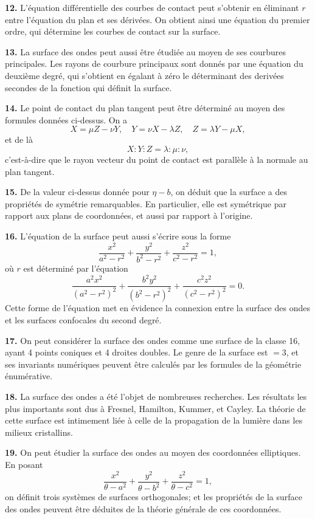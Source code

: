 \documentclass[12pt,a4paper]{article}
\begin{document}
\textbf{12.} L'\'equation diff\'erentielle des courbes de contact peut s'obtenir en
\'eliminant $r$ entre l'\'equation du plan et ses d\'eriv\'ees. On obtient ainsi une
\'equation du premier ordre, qui d\'etermine les courbes de contact sur la surface.

\textbf{13.} La surface des ondes peut aussi \^etre \'etudi\'ee au moyen de ses
courbures principales. Les rayons de courbure principaux sont donn\'es par une
\'equation du deuxi\`eme degr\'e, qui s'obtient en \'egalant \`a z\'ero le d\'eterminant des
deriv\'ees secondes de la fonction qui d\'efinit la surface.

\textbf{14.} Le point de contact du plan tangent peut \^etre d\'etermin\'e au moyen
des formules donn\'ees ci-dessus. On a
\[
X = \mu Z - \nu Y, \quad Y = \nu X - \lambda Z, \quad Z = \lambda Y - \mu X,
\]
et de l\`a
\[
X : Y : Z = \lambda : \mu : \nu,
\]
c'est-\`a-dire que le rayon vecteur du point de contact est parall\`ele \`a la normale au
plan tangent.

\newpage
\textbf{15.} De la valeur ci-dessus donn\'ee pour $\eta - b$, on d\'eduit que la surface
a des propri\'et\'es de sym\'etrie remarquables. En particulier, elle est sym\'etrique
par rapport aux plans de coordonn\'ees, et aussi par rapport \`a l'origine.

\textbf{16.} L'\'equation de la surface peut aussi s'\'ecrire sous la forme
\[
\frac{x^2}{a^2-r^2} + \frac{y^2}{b^2-r^2} + \frac{z^2}{c^2-r^2} = 1,
\]
o\`u $r$ est d\'etermin\'e par l'\'equation
\[
\frac{a^2x^2}{(a^2-r^2)^2} + \frac{b^2y^2}{(b^2-r^2)^2} + \frac{c^2z^2}{(c^2-r^2)^2} = 0.
\]
Cette forme de l'\'equation met en \'evidence la connexion entre la surface des ondes
et les surfaces confocales du second degr\'e.

\textbf{17.} On peut consid\'erer la surface des ondes comme une surface de la
classe 16, ayant 4 points coniques et 4 droites doubles. Le genre de la surface
est $= 3$, et ses invariants num\'eriques peuvent \^etre calcul\'es par les formules de la
g\'eom\'etrie \'enum\'erative.

\textbf{18.} La surface des ondes a \'et\'e l'objet de nombreuses recherches. Les
r\'esultats les plus importants sont dus \`a Fresnel, Hamilton, Kummer, et Cayley.
La th\'eorie de cette surface est intimement li\'ee \`a celle de la propagation de la
lumi\`ere dans les milieux cristallins.

\textbf{19.} On peut \'etudier la surface des ondes au moyen des coordonn\'ees
elliptiques. En posant
\[
\frac{x^2}{\theta-a^2} + \frac{y^2}{\theta-b^2} + \frac{z^2}{\theta-c^2} = 1,
\]
on d\'efinit trois syst\`emes de surfaces orthogonales; et les propri\'et\'es de la surface
des ondes peuvent \^etre d\'eduites de la th\'eorie g\'en\'erale de ces coordonn\'ees.
\end{document}
